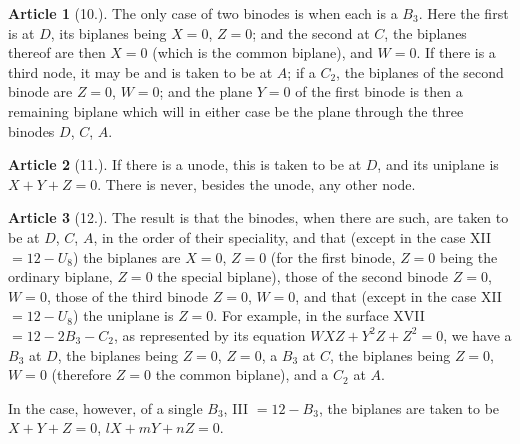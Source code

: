 \documentclass[11pt,a4paper]{article}
\theoremstyle{definition}
\newtheorem{art}{Article}
\begin{document}
\begin{art}[10.]
The only case of two binodes is when each is a $B_3$. Here the first is at $D$, its biplanes being $X = 0$, $Z = 0$; and the second at $C$, the biplanes thereof are then $X = 0$ (which is the common biplane), and $W = 0$. If there is a third node, it may be and is taken to be at $A$; if a $C_2$, the biplanes of the second binode are $Z = 0$, $W = 0$; and the plane $Y = 0$ of the first binode is then a remaining biplane which will in either case be the plane through the three binodes $D$, $C$, $A$.
\end{art}

\begin{art}[11.]
If there is a unode, this is taken to be at $D$, and its uniplane is $X + Y + Z = 0$. There is never, besides the unode, any other node.
\end{art}

\begin{art}[12.]
The result is that the binodes, when there are such, are taken to be at $D$, $C$, $A$, in the order of their speciality, and that (except in the case XII $= 12 - U_8$) the biplanes are $X = 0$, $Z = 0$ (for the first binode, $Z = 0$ being the ordinary biplane, $Z = 0$ the special biplane), those of the second binode $Z = 0$, $W = 0$, those of the third binode $Z = 0$, $W = 0$, and that (except in the case XII $= 12 - U_8$) the uniplane is $Z = 0$. For example, in the surface XVII $= 12 - 2B_3 - C_2$, as represented by its equation $WXZ + Y^2Z + Z^2 = 0$, we have a $B_3$ at $D$, the biplanes being $Z = 0$, $Z = 0$, a $B_3$ at $C$, the biplanes being $Z = 0$, $W = 0$ (therefore $Z = 0$ the common biplane), and a $C_2$ at $A$.

In the case, however, of a single $B_3$, III $= 12 - B_3$, the biplanes are taken to be $X + Y + Z = 0$, $lX + mY + nZ = 0$.
\end{art}
\end{document}
